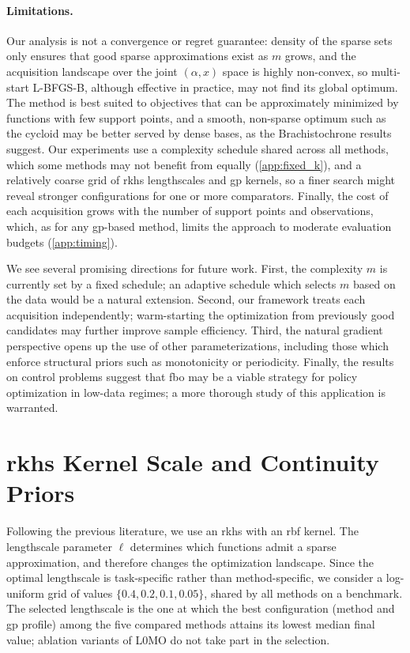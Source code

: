 \documentclass{article}
\newcommand{\wycoff}{\textsc{L0MO}}
\begin{document}
\paragraph{Limitations.}
Our analysis is not a convergence or regret guarantee: density of the sparse sets only ensures that good sparse approximations exist as $m$ grows, and the acquisition landscape over the joint $(\alpha, x)$ space is highly non-convex, so multi-start L-BFGS-B, although effective in practice, may not find its global optimum.
The method is best suited to objectives that can be approximately minimized by functions with few support points, and a smooth, non-sparse optimum such as the cycloid may be better served by dense bases, as the Brachistochrone results suggest.
Our experiments use a complexity schedule shared across all methods, which some methods may not benefit from equally (\cref{app:fixed_k}), and a relatively coarse grid of \gls{rkhs} lengthscales and \gls{gp} kernels, so a finer search might reveal stronger configurations for one or more comparators.
Finally, the cost of each acquisition grows with the number of support points and observations, which, as for any \gls{gp}-based method, limits the approach to moderate evaluation budgets (\cref{app:timing}).

We see several promising directions for future work. First, the complexity $m$ is currently set by a fixed schedule; an adaptive schedule which selects $m$ based on the data would be a natural extension. Second, our framework treats each acquisition independently; warm-starting the optimization from previously good candidates may further improve sample efficiency. Third, the natural gradient perspective opens up the use of other parameterizations, including those which enforce structural priors such as monotonicity or periodicity. Finally, the results on control problems suggest that \gls{fbo} may be a viable strategy for policy optimization in low-data regimes; a more thorough study of this application is warranted.



\newpage



\appendix
\FloatBarrier
\section{\gls{rkhs} Kernel Scale and Continuity Priors}
\label{app:ablations}

Following the previous literature, we use an \gls{rkhs} with an \gls{rbf} kernel.
The lengthscale parameter $\ell$ determines which functions admit a sparse approximation, and therefore changes the optimization landscape.
Since the optimal lengthscale is task-specific rather than method-specific, we consider a log-uniform grid of values $\{0.4, 0.2, 0.1, 0.05\}$, shared by all methods on a benchmark.
The selected lengthscale is the one at which the best configuration (method and \gls{gp} profile) among the five compared methods attains its lowest median final value; ablation variants of \wycoff{} do not take part in the selection.
\end{document}
